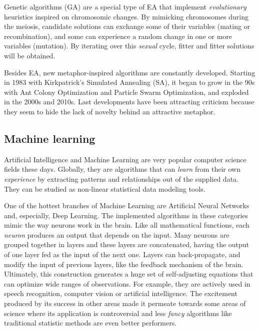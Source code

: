 Genetic algorithms (GA) are a special type of EA that implement \textit{evolutionary} heuristics inspired on chromosomic changes. By mimicking chromosomes during the meiosis, candidate solutions can exchange some of their variables (mating or recombination), and some can experience a random change in one or more variables (mutation). By iterating over this \textit{sexual} cycle, fitter and fitter solutions will be obtained.

Besides EA, new metaphor-inspired algorithms are constantly developed. Starting in 1983 with Kirkpatrick's Simulated Annealing (SA)\cite{kirkpatrick1983optimization}, it began to grow in the 90s with Ant Colony Optimization\cite{maniezzo1992distributed} and Particle Swarm Optimization,\cite{eberhart1995new} and exploded in the 2000s and 2010s. Last developments have been attracting criticism because they seem to hide the lack of novelty behind an attractive metaphor.\cite{S_rensen_2013,brownlee2015,swan2015research,Glover_2015}

\subsection{Machine learning}
Artificial Intelligence and Machine Learning are very popular computer science fields these days. Globally, they are algorithms that can \textit{learn} from their own \textit{experience} by extracting patterns and relationships out of the supplied data. They can be studied as non-linear statistical data modeling tools.

One of the hottest branches of Machine Learning are Artificial Neural Networks and, especially, Deep Learning. The implemented algorithms in these categories mimic the way neurons work in the brain. Like all mathematical functions, each \textit{neuron} produces an output that depends on the input. Many neurons are grouped together in layers and these layers are concatenated, having the output of one layer fed as the input of the next one. Layers can back-propagate, and modify the input of previous layers, like the feedback mechanism of the brain. Ultimately, this construction generates a huge set of self-adjusting equations that can optimize wide ranges of observations. For example, they are actively used in speech recognition, computer vision or artificial intelligence. The excitement produced by its success in other areas made it permeate towards some areas of science where its application is controversial and less \textit{fancy} algorithms like traditional statistic methods are even better performers.\cite{makridakis2018statistical}

